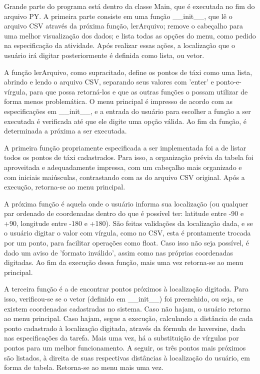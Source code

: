 Grande parte do programa está dentro da classe Main, que é executada no fim do arquivo PY. A primeira parte consiste em uma função \_\_init\_\_, que lê o arquivo CSV através da próxima função, lerArquivo; remove o cabeçalho para uma melhor visualização dos dados; e lista todas as opções do menu, como pedido na especificação da atividade. Após realizar essas ações, a localização que o usuário irá digitar posteriormente é definida como lista, ou vetor.

A função lerArquivo, como supracitado, define os pontos de táxi como uma lista, abrindo e lendo o arquivo CSV, separando seus valores com 'enter' e ponto-e-vírgula, para que possa retorná-los e que as outras funções o possam utilizar de forma menos problemática. O menu principal é impresso de acordo com as especificações em \_\_init\_\_, e a entrada do usuário para escolher a função a ser executada é verificada até que ele digite uma opção válida. Ao fim da função, é determinada a próxima a ser executada.

A primeira função propriamente especificada a ser implementada foi a de listar todos os pontos de táxi cadastrados. Para isso, a organização prévia da tabela foi aproveitada e adequadamente impressa, com um cabeçalho mais organizado e com iniciais maiúsculas, contrastando com as do arquivo CSV original. Após a execução, retorna-se ao menu principal.

A próxima função é aquela onde o usuário informa sua localização (ou qualquer par ordenado de coordenadas dentro do que é possível ter: latitude entre -90 e +90, longitude entre -180 e +180). São feitas validações da localização dada, e se o usuário digitar o valor com vírgula, como no CSV, esta é prontamente trocada por um ponto, para facilitar operações como float. Caso isso não seja possível, é dado um aviso de 'formato inválido', assim como nas próprias coordenadas digitadas. Ao fim da execução dessa função, mais uma vez retorna-se ao menu principal.

A terceira função é a de encontrar pontos próximos à localização digitada. Para isso, verificou-se se o vetor (definido em \_\_init\_\_) foi preenchido, ou seja, se existem coordenadas cadastradas no sistema. Caso não hajam, o usuário retorna ao menu principal. Caso hajam, segue a execução, calculando a distância de cada ponto cadastrado à localização digitada, através da fórmula de haversine, dada nas especificações da tarefa. Mais uma vez, há a substituição de vírgulas por pontos para um melhor funcionamento. A seguir, os três pontos mais próximos são listados, à direita de suas respectivas distâncias à localização do usuário, em forma de tabela. Retorna-se ao menu mais uma vez.

